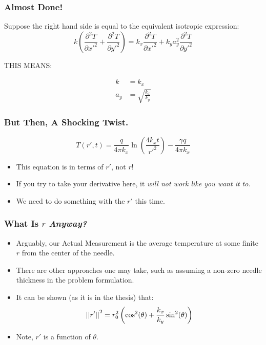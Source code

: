 \documentclass{beamer}
\begin{document}
\begin{frame}
\frametitle{Almost Done!}
Suppose the right hand side is equal to the equivalent isotropic expression:
\begin{equation*}
k\left(\frac{\partial^2 T}{\partial {x'}^2} + \frac{\partial^2 T}{\partial {y'}^2} \right) = k_x\frac{\partial^2 T}{\partial {x'}^2} + k_ya_y^2\frac{\partial^2 T}{\partial {y'}^2}
\end{equation*}

THIS MEANS:

\begin{align*}
k &= k_x\\
a_y &= \sqrt{\frac{k_x}{k_y}}
\end{align*}
\end{frame}

\begin{frame}
\frametitle{But Then, A Shocking Twist.}
\begin{equation*}
T(r',t) = \frac{q}{4\pi k_x}\ln\left(\frac{4k_xt}{r'^2}\right) - \frac{\gamma q}{4\pi k_x}
\end{equation*}
\begin{itemize}
\item This equation is in terms of \(r'\), not \(r\)!
\item If you try to take your derivative here, it \emph{will not work like you want it to}.
\item We need to do something with the \(r'\) this time.
\end{itemize}
\end{frame}


\begin{frame}
\frametitle{What Is \(r\) \emph{Anyway?}}
\begin{itemize}
\item Arguably, our Actual Measurement is the average temperature at some finite 
\(r\) from the center of the needle.
\item There are other approaches one may take, such as assuming a non-zero needle
thickness in the problem formulation.
\item It can be shown (as it is in the thesis) that:
\begin{equation*}
    \left|\left|{r'}\right|\right|^2 = r_0^2 \left(\cos^2(\theta) + \frac{k_x}{k_y}\sin^2(\theta) \right)
\end{equation*}
\item Note, \(r'\) is a function of \(\theta\).
\end{itemize}
\end{frame}
\end{document}
